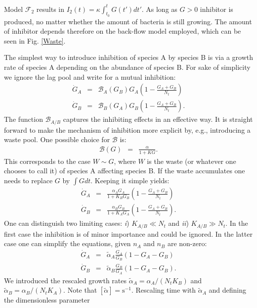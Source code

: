 \documentclass[10pt,A4paper]{article}
\begin{document}
Model $\mathcal{F}_2$ results in $I_2(t)=\kappa\int_{t_0}^tG(t')dt'$. 
As long as $G>0$ inhibitor is produced, no matter whether the amount of bacteria is still growing. 
The amount of inhibitor depends therefore on the back-flow model employed, which can be seen in Fig. \ref{Waste}. 



The simplest way to introduce inhibition of species A by species B is via a growth rate of species A depending on the abundance of species B. 
For sake of simplicity we ignore the lag pool and write for a mutual inhibition:
\begin{eqnarray}
\dot{G}_A &=& \mathcal{B}_A(G_B)G_A\left(1 - \frac{G_A+G_B}{N_t}\right )\\
\dot{G}_B &=& \mathcal{B}_B(G_A) G_B\left(1-\frac{G_A+G_B}{N_t}\right ). 
\end{eqnarray}
The function $\mathcal{B}_{A/B}$ captures the inhibiting effects in an effective way. It is straight forward to make the mechanism of inhibition more explicit by, e.g., introducing a waste pool. One possible choice for $\mathcal{B}$ is: 
\begin{eqnarray}
\mathcal{B}(G)&=&\frac{\alpha}{1+KG}. 
\end{eqnarray}
This corresponds to the case $W\sim G$, where $W$ is the waste (or whatever one chooses to call it) of species A affecting species B. If the waste accumulates one needs to replace $G$ by $\int G dt$. Keeping it simple yields:
\begin{eqnarray}
\dot{G}_A &=& \frac{\alpha_A G_A}{1+K_BG_B}\left(1 - \frac{G_A+G_B}{N_t}\right )\\
\dot{G}_B &=& \frac{\alpha_B G_B}{1+K_AG_A}\left(1-\frac{G_A+G_B}{N_t}\right ). 
\end{eqnarray}
One can distinguish two limiting cases: {\it i}) $K_{A/B}\ll N_t$ and {\it ii}) $K_{A/B}\gg N_t$. In the first case the inhibition is of minor importance and could be ignored. In the latter case one can simplify the equations, given $n_A$ and $n_B$ are non-zero:
\begin{eqnarray}
\label{Mut_Inhib}
\dot{G}_A &=&\tilde{\alpha}_A\frac{G_A}{G_B}\left(1 - G_A-G_B\right )\\
\dot{G}_B &=& \tilde{\alpha}_B\frac{G_B}{G_A}\left(1-G_A-G_B\right ). 
\end{eqnarray}
We introduced the rescaled growth rates $\tilde{\alpha}_A=\alpha_A/(N_tK_B)$ and $\tilde{\alpha}_B=\alpha_B/(N_tK_A)$. Note that $[\tilde{\alpha}]=\mathrm{s}^{-1}$. Rescaling time with $\tilde{\alpha}_A$ and defining the dimensionless parameter 
\end{document}
